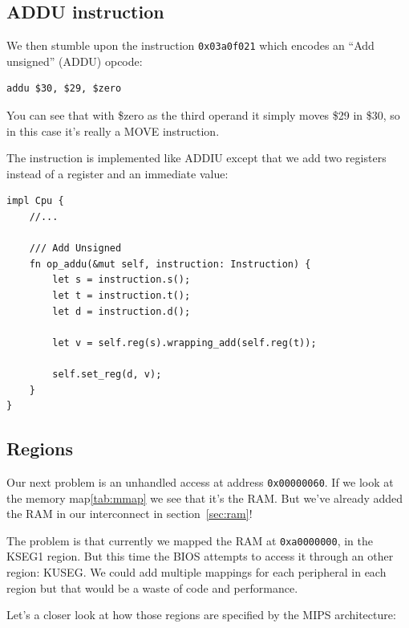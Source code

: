 \documentclass[a4paper]{article}
\newcommand{\code}[1] {\texttt{#1}}
\begin{document}
\subsection{ADDU instruction}

We then stumble upon the instruction \code{0x03a0f021} which encodes
an ``Add unsigned'' (ADDU) opcode:

\begin{lstlisting}[language=assembly]
addu $30, $29, $zero
\end{lstlisting}

You can see that with \$zero as the third operand it simply moves \$29
in \$30, so in this case it's really a MOVE instruction.

The instruction is implemented like ADDIU except that we add two
registers instead of a register and an immediate value:

\begin{lstlisting}
impl Cpu {
    //...

    /// Add Unsigned
    fn op_addu(&mut self, instruction: Instruction) {
        let s = instruction.s();
        let t = instruction.t();
        let d = instruction.d();

        let v = self.reg(s).wrapping_add(self.reg(t));

        self.set_reg(d, v);
    }
}
\end{lstlisting}

\subsection{Regions}

Our next problem is an unhandled access at address
\code{0x00000060}. If we look at the memory map\ref{tab:mmap} we see
  that it's the RAM. But we've already added the RAM in our
  interconnect in section~\ref{sec:ram}!

The problem is that currently we mapped the RAM at \code{0xa0000000},
in the KSEG1 region. But this time the BIOS attempts to access it
through an other region: KUSEG. We could add multiple mappings for
each peripheral in each region but that would be a waste of code and
performance.

Let's a closer look at how those regions are specified by the MIPS
architecture:
\end{document}
